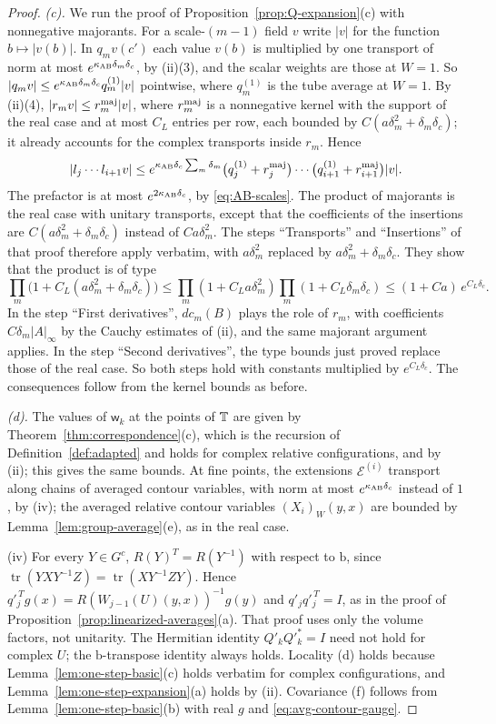 \begin{proof}
\emph{(c).} We run the proof of Proposition~\ref{prop:Q-expansion}(c) with nonnegative majorants. For a scale-$(m-1)$ field $v$ write $|v|$ for the function $b\mapsto|v(b)|$. In $q_mv(c')$ each value $v(b)$ is multiplied by one transport of norm at most $e^{\kappa_{\rm AB}\delta_m\delta_c}$, by (ii)(3), and the scalar weights are those at $W=1$. So $|q_mv|\le e^{\kappa_{\rm AB}\delta_m\delta_c}q^{(1)}_m|v|$ pointwise, where $q^{(1)}_m$ is the tube average at $W=1$. By (ii)(4), $|r_mv|\le r^{\rm maj}_m|v|$, where $r^{\rm maj}_m$ is a nonnegative kernel with the support of the real case and at most $C_L$ entries per row, each bounded by $C(a\delta_m^2+\delta_m\delta_c)$; it already accounts for the complex transports inside $r_m$. Hence
\[
|l_j\cdots l_{i+1}v|\le e^{\kappa_{\rm AB}\delta_c\sum_m\delta_m}\big(q^{(1)}_j+r^{\rm maj}_j\big)\cdots\big(q^{(1)}_{i+1}+r^{\rm maj}_{i+1}\big)|v| .
\]
The prefactor is at most $e^{2\kappa_{\rm AB}\delta_c}$, by \eqref{eq:AB-scales}. The product of majorants is the real case with unitary transports, except that the coefficients of the insertions are $C(a\delta_m^2+\delta_m\delta_c)$ instead of $Ca\delta_m^2$. The steps ``Transports'' and ``Insertions'' of that proof therefore apply verbatim, with $a\delta_m^2$ replaced by $a\delta_m^2+\delta_m\delta_c$. They show that the product is of type
\[
\prod_m\big(1+C_L(a\delta_m^2+\delta_m\delta_c)\big)\le\prod_m(1+C_La\delta_m^2)\prod_m(1+C_L\delta_m\delta_c)\le(1+Ca)\,e^{C_L\delta_c}.
\]
In the step ``First derivatives'', $dc_m(B)$ plays the role of $r_m$, with coefficients $C\delta_m|A|_\infty$ by the Cauchy estimates of (ii), and the same majorant argument applies. In the step ``Second derivatives'', the type bounds just proved replace those of the real case. So both steps hold with constants multiplied by $e^{C_L\delta_c}$. The consequences follow from the kernel bounds as before.

\emph{(d).} The values of $\mathsf w_k$ at the points of $\mathbb T$ are given by Theorem~\ref{thm:correspondence}(c), which is the recursion of Definition~\ref{def:adapted} and holds for complex relative configurations, and by (ii); this gives the same bounds. At fine points, the extensions $\mathcal E^{(i)}$ transport along chains of averaged contour variables, with norm at most $e^{\kappa_{\rm AB}\delta_c}$ instead of $1$, by (iv); the averaged relative contour variables $(X_i)_W(y,x)$ are bounded by Lemma~\ref{lem:group-average}(e), as in the real case.

(iv) For every $Y\in G^c$, $R(Y)^T=R(Y^{-1})$ with respect to $\mathrm b$, since $\operatorname{tr}(YXY^{-1}Z)=\operatorname{tr}(XY^{-1}ZY)$. Hence $q'^{\,T}_jg(x)=R(W_{j-1}(U)(y,x))^{-1}g(y)$ and $q'_jq'^{\,T}_j=I$, as in the proof of Proposition~\ref{prop:linearized-averages}(a). That proof uses only the volume factors, not unitarity. The Hermitian identity $Q'_kQ'^*_k=I$ need not hold for complex $U$; the $\mathrm b$-transpose identity always holds. Locality (d) holds because Lemma~\ref{lem:one-step-basic}(c) holds verbatim for complex configurations, and Lemma~\ref{lem:one-step-expansion}(a) holds by (ii). Covariance (f) follows from Lemma~\ref{lem:one-step-basic}(b) with real $g$ and \eqref{eq:avg-contour-gauge}.


\end{proof}
